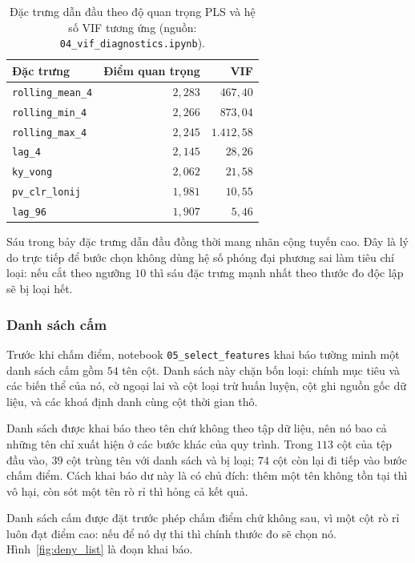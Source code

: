 \begin{table}[htbp]
\centering
\caption{Đặc trưng dẫn đầu theo độ quan trọng PLS và hệ số VIF tương ứng (nguồn: \texttt{04\_vif\_diagnostics.ipynb}).}
\label{tab:pls}
\small
\begin{tabular}{l r r}
\toprule
\textbf{Đặc trưng} & \textbf{Điểm quan trọng} & \textbf{VIF} \\
\midrule
\texttt{rolling\_mean\_4} & $2{,}283$ & $467{,}40$ \\
\texttt{rolling\_min\_4}  & $2{,}266$ & $873{,}04$ \\
\texttt{rolling\_max\_4}  & $2{,}245$ & $1.412{,}58$ \\
\texttt{lag\_4}          & $2{,}145$ & $28{,}26$ \\
\texttt{ky\_vong}        & $2{,}062$ & $21{,}58$ \\
\texttt{pv\_clr\_lonij}   & $1{,}981$ & $10{,}55$ \\
\texttt{lag\_96}         & $1{,}907$ & $5{,}46$ \\
\bottomrule
\end{tabular}
\end{table}

Sáu trong bảy đặc trưng dẫn đầu đồng thời mang nhãn cộng tuyến cao. Đây là lý do trực tiếp để
bước chọn không dùng hệ số phóng đại phương sai làm tiêu chí loại: nếu cắt theo ngưỡng $10$ thì
sáu đặc trưng mạnh nhất theo thước đo độc lập sẽ bị loại hết.

\subsubsection{Danh sách cấm}

Trước khi chấm điểm, notebook \texttt{05\_select\_features} khai báo tường minh một danh sách cấm
gồm $54$ tên cột. Danh sách này chặn bốn loại: chính mục tiêu và các biến thể của nó, cờ ngoại
lai và cột loại trừ huấn luyện, cột ghi nguồn gốc dữ liệu, và các khoá định danh cùng cột thời
gian thô.

Danh sách được khai báo theo tên chứ không theo tập dữ liệu, nên nó bao cả những tên chỉ xuất
hiện ở các bước khác của quy trình. Trong $113$ cột của tệp đầu vào, $39$ cột trùng tên với
danh sách và bị loại; $74$ cột còn lại đi tiếp vào bước chấm điểm. Cách khai báo dư này là có
chủ đích: thêm một tên không tồn tại thì vô hại, còn sót một tên rò rỉ thì hỏng cả kết quả.

Danh sách cấm được đặt trước phép chấm điểm chứ không sau, vì một cột rò rỉ luôn đạt điểm cao:
nếu để nó dự thi thì chính thước đo sẽ chọn nó. Hình~\ref{fig:deny_list} là đoạn khai báo.

